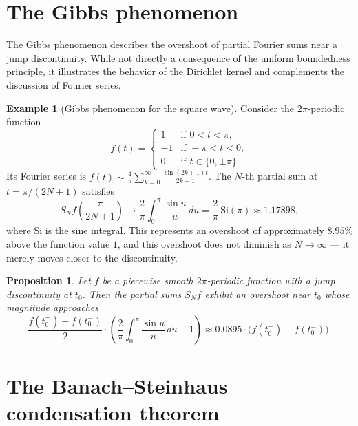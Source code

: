 \documentclass[a4paper,12pt]{book}
\theoremstyle{definition}
\newtheorem{example}[definition]{Example}
\theoremstyle{plain}
\newtheorem{proposition}[definition]{Proposition}
\theoremstyle{remark}
\begin{document}
\section{The Gibbs phenomenon}\label{sec:gibbs}

The Gibbs phenomenon describes the overshoot of partial Fourier sums near a jump
discontinuity. While not directly a consequence of the uniform boundedness principle,
it illustrates the behavior of the Dirichlet kernel and complements the discussion
of Fourier series.

\begin{example}[Gibbs phenomenon for the square wave]\label{ex:gibbs-square}
Consider the $2\pi$-periodic function
\[
  f(t) = \begin{cases} 1 & \text{if } 0 < t < \pi, \\
  -1 & \text{if } -\pi < t < 0, \\ 0 & \text{if } t \in \{0, \pm\pi\}.\end{cases}
\]
Its Fourier series is
$f(t) \sim \frac{4}{\pi}\sum_{k=0}^{\infty} \frac{\sin(2k+1)t}{2k+1}$.
The $N$-th partial sum at $t = \pi/(2N+1)$ satisfies
\[
  S_N f\!\left(\frac{\pi}{2N+1}\right) \to
  \frac{2}{\pi}\int_0^{\pi} \frac{\sin u}{u}\, du
  = \frac{2}{\pi}\,\mathrm{Si}(\pi) \approx 1.17898,
\]
where $\mathrm{Si}$ is the sine integral. This represents an
overshoot of approximately $8.95\%$ above the function value $1$, and this overshoot
does not diminish as $N \to \infty$ --- it merely moves closer to the discontinuity.
\end{example}

\begin{proposition}\label{prop:gibbs-overshoot}
Let $f$ be a piecewise smooth $2\pi$-periodic function with a jump discontinuity at
$t_0$. Then the partial sums $S_N f$ exhibit an overshoot near $t_0$ whose magnitude
approaches
\[
  \frac{f(t_0^+) - f(t_0^-)}{2} \cdot
  \left(\frac{2}{\pi}\int_0^{\pi}\frac{\sin u}{u}\,du - 1\right)
  \approx 0.0895 \cdot \bigl(f(t_0^+) - f(t_0^-)\bigr).
\]
\end{proposition}

\section{The Banach--Steinhaus condensation theorem}%
\label{sec:condensation}
\end{document}
